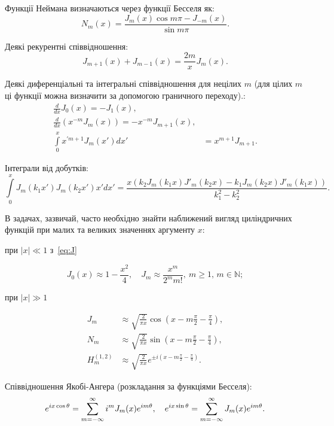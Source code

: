 Функції Неймана визначаються через функції Бесселя як:
\begin{equation}\label{eq:NG}
    N_m(x) = \frac{J_m(x)\cos m\pi - J_{-m}(x)}{\sin m\pi}.
\end{equation}


Деякі рекурентні співвідношення:
\begin{equation}
    J_{m + 1}(x) + J_{m - 1}(x) = \frac{2m}{x}J_m(x).
\end{equation}

Деякі диференціальні та інтегральні співвідношення для нецілих $m$ (для цілих $m$ ці функції можна визначити за допомогою граничного переходу).:
\begin{align}
    \frac{d}{dx} J_0(x) = - J_1(x), \\
    \frac{d}{dx} \left( x^{-m}J_m(x)\right)  = - x^{-m}J_{m+1}(x), \\
     \int\limits_0^{x} x^{\prime m+1} J_m(x') dx' &= x^{m+1}J_{m+1}. \label{eq:recInt}
\end{align}

Інтеграли від добутків:
\begin{equation}
    \int\limits_0^x  J_m(k_1x')J_m(k_2x') x' dx' = \frac{x\left( k_2J_m(k_1x)J'_m(k_2x) - k_1J_m(k_2x)J'_m(k_1x)\right)}{k_1^2-k_2^{2}}   \label{eq:JJ0*}.
\end{equation}

В задачах, зазвичай, часто необхідно знайти наближений вигляд циліндричних функцій при малих та великих значеннях аргументу $x$:

при $|x| \ll 1$ з~\eqref{eq:J}

\begin{equation}
    J_0(x) \approx 1 - \frac{x^2}{4}, \quad
    J_m \approx \frac{x^m}{2^m m!}, \ m \ge 1,\, m \in \mathbb{N};
\end{equation}

при $|x| \gg 1$

\begin{align}
    J_m &\approx \sqrt{\frac{2}{\pi x}}  \cos\left( x - m\frac{\pi}{2} - \frac{\pi}{4}\right),
      \label{eq:Jxgg1}\\
    N_m &\approx \sqrt{\frac{2}{\pi x}}  \sin\left( x - m\frac{\pi}{2} - \frac{\pi}{4}\right),
  \label{eq:Yxgg1}\\
    H_m^{(1,2)} &\approx \sqrt{\frac{2}{\pi x}}  e^{\pm i \left( x - m\frac{\pi}{2} - \frac{\pi}{4}\right) }. \label{eq:Hxgg1}
\end{align}

Співвідношення Якобі-Ангера (розкладання за функціями Бесселя):
\begin{equation}\label{eq:JacobiAnger}
    e^{ix\cos\theta} = \sum\limits_{m= - \infty}^{\infty} i^mJ_m(x)e^{im\theta}, \quad
    e^{ix\sin\theta} = \sum\limits_{m= - \infty}^{\infty} J_m(x)e^{im\theta}. \\
\end{equation}

